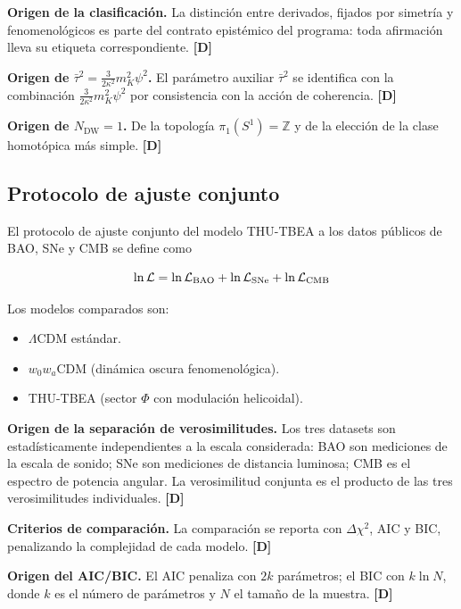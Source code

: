 ﻿\documentclass[11pt,letterpaper]{article}
\begin{document}
\textbf{Origen de la clasificación.} La distinción entre derivados, fijados por simetría y fenomenológicos es parte del contrato epistémico del programa: toda afirmación lleva su etiqueta correspondiente. \textbf{[D]}

\textbf{Origen de $\bar\tau^2 = \frac{3}{2\kappa^2}m_K^2\psi^2$.} El parámetro auxiliar $\bar\tau^2$ se identifica con la combinación $\frac{3}{2\kappa^2}m_K^2\psi^2$ por consistencia con la acción de coherencia. \textbf{[D]}

\textbf{Origen de $N_{\text{DW}} = 1$.} De la topología $\pi_1(S^1) = \mathbb{Z}$ y de la elección de la clase homotópica más simple. \textbf{[D]}
\subsection{Protocolo de ajuste conjunto}
El protocolo de ajuste conjunto del modelo THU-TBEA a los datos públicos de BAO, SNe y CMB se define como

\begin{equation*}
  \resizebox{\ifdim\width>\linewidth \linewidth\else\width\fi}{!}{$\displaystyle \ln\mathcal{L} = \ln\mathcal{L}_{\text{BAO}} + \ln\mathcal{L}_{\text{SNe}} + \ln\mathcal{L}_{\text{CMB}}$}
\end{equation*}

Los modelos comparados son:

\begin{itemize}[leftmargin=*]
\item $\Lambda$CDM estándar.
\item $w_0w_a$CDM (dinámica oscura fenomenológica).
\item THU-TBEA (sector $\Phi$ con modulación helicoidal).
\end{itemize}

\textbf{Origen de la separación de verosimilitudes.} Los tres datasets son estadísticamente independientes a la escala considerada: BAO son mediciones de la escala de sonido; SNe son mediciones de distancia luminosa; CMB es el espectro de potencia angular. La verosimilitud conjunta es el producto de las tres verosimilitudes individuales. \textbf{[D]}

\textbf{Criterios de comparación.} La comparación se reporta con $\Delta\chi^2$, AIC y BIC, penalizando la complejidad de cada modelo. \textbf{[D]}

\textbf{Origen del AIC/BIC.} El AIC penaliza con $2k$ parámetros; el BIC con $k\ln N$, donde $k$ es el número de parámetros y $N$ el tamaño de la muestra. \textbf{[D]}
\end{document}
